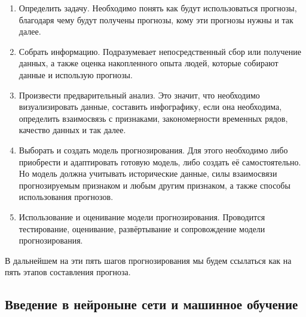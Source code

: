 {  \begin{enumerate} 
    \item Определить задачу. Необходимо понять как будут использоваться прогнозы, благодаря чему будут получены прогнозы, кому эти прогнозы нужны и так далее. 
    \item Собрать информацию. Подразумевает непосредственный сбор или получение данных, а также оценка накопленного опыта людей, которые собирают данные и использую прогнозы.
    \item Произвести предварительный анализ. Это значит, что необходимо визуализировать данные, составить инфографику, если она необходима, определить взаимосвязь с признаками, закономерности временных рядов, качество данных и так далее.
    \item Выборать и создать модель прогнозирования. Для этого необходимо либо приобрести и адаптировать готовую модель, либо создать её самостоятельно. Но модель должна учитывать исторические данные, силы взаимосвязи прогнозируемым признаком и любым другим признаком, а также способы использования прогнозов.
    \item Использование и оценивание модели прогнозирования. Проводится тестирование, оценивание, развёртывание и сопровождение модели прогнозирования. 
  \end{enumerate} 

  \par \redline В дальнейшем на эти пять шагов прогнозирования мы будем ссылаться как на пять этапов составления прогноза.

  \par
}

\titlespace
\subsection{  
  \cyrillicfont 
  \fontsize{14pt}{24pt}\selectfont
  \englishfont
  \redline
  Введение в нейроныне сети и машинное обучение
}
\titlespace

